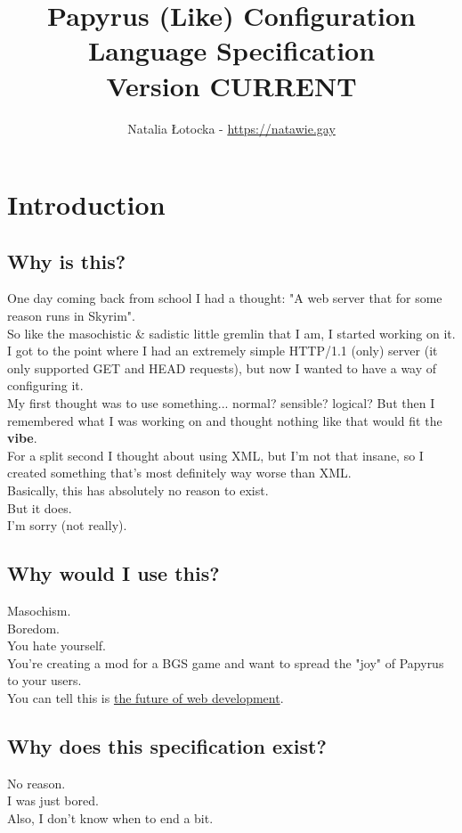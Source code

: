 \documentclass[12pt]{article}
\title{%
    Papyrus (Like) Configuration Language Specification\texorpdfstring{\\}{}
    \large Version CURRENT
}
\author{\foreignlanguage{polish}{Natalia Łotocka} - \texorpdfstring{\url{https://natawie.gay}}{https://natawie.gay}}
\begin{document}
    \maketitle
    \tableofcontents
    \newpage

    \section{Introduction}
    \subsection{Why is this?}
    One day coming back from school I had a thought: "A web server that for some reason runs in Skyrim". \\
    So like the masochistic \& sadistic little gremlin that I am, I started working on it. \\
    I got to the point where I had an extremely simple HTTP/1.1 (only) server (it only supported GET and HEAD requests), but now I wanted to have a way of configuring it. \\
    My first thought was to use something... normal? sensible? logical? But then I remembered what I was working on and thought nothing like that would fit the \textbf{vibe}. \\
    For a split second I thought about using XML, but I'm not that insane, so I created something that's most definitely way worse than XML. \\
    Basically, this has absolutely no reason to exist. \\
    But it does. \\
    I'm sorry (not really).

    \subsection{Why would I use this?}
    Masochism. \\
    Boredom. \\
    You hate yourself. \\
    You're creating a mod for a BGS game and want to spread the "joy" of Papyrus to your users. \\
    You can tell this is \href{https://github.com/PapyrusLikeConfigurationLanguage/PLCLToWeb}{the future of web development}.

    \subsection{Why does this specification exist?}
    No reason. \\
    I was just bored. \\
    Also, I don't know when to end a bit.
\end{document}
